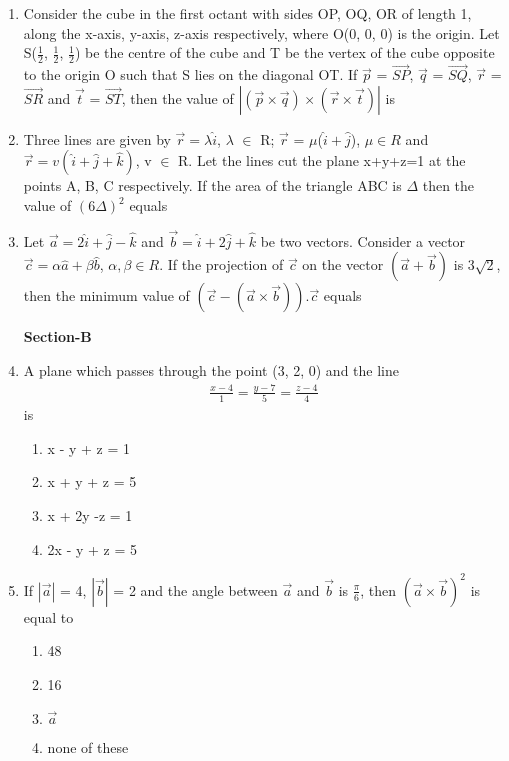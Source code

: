 \begin{enumerate}[label=\arabic*.,ref=\thesubsection.\theenumi]
\item Consider the cube in the first octant with sides OP, OQ, OR of length 1, along the x-axis, y-axis, z-axis respectively, where O(0, 0, 0) is the origin. Let S($\frac{1}{2}$, $\frac{1}{2}$, $\frac{1}{2}$) be the centre of the cube and T be the vertex of the cube opposite to the origin O such that S lies on the diagonal OT. If 
$\overrightarrow{p}$ = $\overrightarrow{SP}$, $\overrightarrow{q}$ = $\overrightarrow{SQ}$, $\overrightarrow{r}$ = $\overrightarrow{SR}$ and $\overrightarrow{t}$ = $\overrightarrow{ST}$, then the value of $|(\overrightarrow{p} \times \overrightarrow{q}) \times (\overrightarrow{r} \times \overrightarrow{t})|$ is

\item Three lines are given by $\overrightarrow{r} = \lambda\hat{i}$, $\lambda$ $\in$ R; $\overrightarrow{r}$ = $\mu$($\hat{i} + \hat{j}$), $\mu \in R$ and $\overrightarrow{r} = v(\hat{i}+\hat{j}+\hat{k})$, v $\in$ R. Let the lines cut the plane x+y+z=1 at the points A, B, C respectively. If the area of the triangle ABC is $\Delta$ then the value of $(6\Delta)^{2}$ equals

\item Let $\overrightarrow{a} = 2\hat{i} + \hat{j} - \hat{k}$ and $\overrightarrow{b} = \hat{i} + 2\hat{j} + \hat{k}$ be two vectors. Consider a vector $\overrightarrow{c} = \alpha\hat{a} + \beta\hat{b}$, $\alpha, \beta \in R$. If the projection of $\overrightarrow{c}$ on the vector $(\overrightarrow{a} + \overrightarrow{b})$ is 3$\sqrt{2}$, then the minimum value of $(\overrightarrow{c}-(\overrightarrow{a} \times \overrightarrow{b})).\overrightarrow{c}$ equals

\textbf{Section-B}

\item A plane which passes through the point (3, 2, 0) and the line
\begin{align*}
\frac{x-4}{1} = \frac{y-7}{5} = \frac{z-4}{4}
\end{align*}
is
\begin{enumerate}
\item x - y + z = 1
\item x + y + z = 5
\item x + 2y -z = 1
\item 2x - y + z = 5
\end{enumerate}

\item If $|\overrightarrow{a}|$ = 4, $|\overrightarrow{b}|$ = 2 and the angle between $\overrightarrow{a}$ and $\overrightarrow{b}$ is $\frac{\pi}{6}$, then $(\overrightarrow{a} \times \overrightarrow{b})^{2}$ is equal to
\begin{enumerate}
\item 48
\item 16
\item $\overrightarrow{a}$
\item none of these
\end{enumerate}


\end{enumerate}
